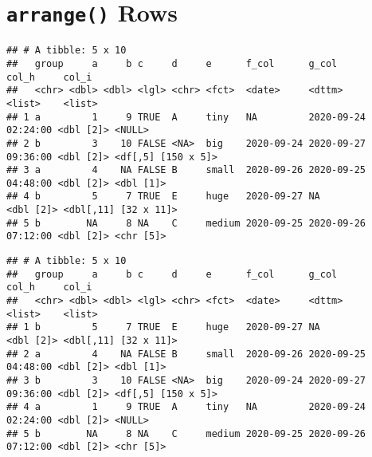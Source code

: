 \documentclass[
]{book}
\newenvironment{Shaded}{\begin{snugshade}}{\end{snugshade}}
\newcommand{\KeywordTok}[1]{\textcolor[rgb]{0.13,0.29,0.53}{\textbf{#1}}}
\newcommand{\NormalTok}[1]{#1}
\newcommand{\OperatorTok}[1]{\textcolor[rgb]{0.81,0.36,0.00}{\textbf{#1}}}
\newcommand{\StringTok}[1]{\textcolor[rgb]{0.31,0.60,0.02}{#1}}
\begin{document}
\hypertarget{arrange-rows}{%
\section{\texorpdfstring{\texttt{arrange()} Rows}{arrange() Rows}}\label{arrange-rows}}

\begin{Shaded}
\end{Shaded}

\begin{verbatim}
## # A tibble: 5 x 10
##   group     a     b c     d     e      f_col      g_col               col_h     col_i               
##   <chr> <dbl> <dbl> <lgl> <chr> <fct>  <date>     <dttm>              <list>    <list>              
## 1 a         1     9 TRUE  A     tiny   NA         2020-09-24 02:24:00 <dbl [2]> <NULL>              
## 2 b         3    10 FALSE <NA>  big    2020-09-24 2020-09-27 09:36:00 <dbl [2]> <df[,5] [150 x 5]>  
## 3 a         4    NA FALSE B     small  2020-09-26 2020-09-25 04:48:00 <dbl [2]> <dbl [1]>           
## 4 b         5     7 TRUE  E     huge   2020-09-27 NA                  <dbl [2]> <dbl[,11] [32 x 11]>
## 5 b        NA     8 NA    C     medium 2020-09-25 2020-09-26 07:12:00 <dbl [2]> <chr [5]>
\end{verbatim}

\begin{Shaded}
\end{Shaded}

\begin{verbatim}
## # A tibble: 5 x 10
##   group     a     b c     d     e      f_col      g_col               col_h     col_i               
##   <chr> <dbl> <dbl> <lgl> <chr> <fct>  <date>     <dttm>              <list>    <list>              
## 1 b         5     7 TRUE  E     huge   2020-09-27 NA                  <dbl [2]> <dbl[,11] [32 x 11]>
## 2 a         4    NA FALSE B     small  2020-09-26 2020-09-25 04:48:00 <dbl [2]> <dbl [1]>           
## 3 b         3    10 FALSE <NA>  big    2020-09-24 2020-09-27 09:36:00 <dbl [2]> <df[,5] [150 x 5]>  
## 4 a         1     9 TRUE  A     tiny   NA         2020-09-24 02:24:00 <dbl [2]> <NULL>              
## 5 b        NA     8 NA    C     medium 2020-09-25 2020-09-26 07:12:00 <dbl [2]> <chr [5]>
\end{verbatim}

  
\end{document}

